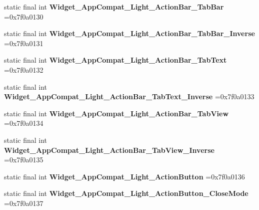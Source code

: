 \begin{DoxyCompactItemize}
\mbox{\label{classproject4_1_1xaria_1_1R_1_1style_a75f0b30f347bdeb58b26cc3a9783d413}} 
static final int {\bfseries Widget\+\_\+\+App\+Compat\+\_\+\+Light\+\_\+\+Action\+Bar\+\_\+\+Tab\+Bar} =0x7f0a0130
\item 
\mbox{\label{classproject4_1_1xaria_1_1R_1_1style_a1adcb303b357611724eb052666e404a6}} 
static final int {\bfseries Widget\+\_\+\+App\+Compat\+\_\+\+Light\+\_\+\+Action\+Bar\+\_\+\+Tab\+Bar\+\_\+\+Inverse} =0x7f0a0131
\item 
\mbox{\label{classproject4_1_1xaria_1_1R_1_1style_a30e60078851ed6f65f0cc13171021b13}} 
static final int {\bfseries Widget\+\_\+\+App\+Compat\+\_\+\+Light\+\_\+\+Action\+Bar\+\_\+\+Tab\+Text} =0x7f0a0132
\item 
\mbox{\label{classproject4_1_1xaria_1_1R_1_1style_ad355df986001f8c977b7c23190f5b34e}} 
static final int {\bfseries Widget\+\_\+\+App\+Compat\+\_\+\+Light\+\_\+\+Action\+Bar\+\_\+\+Tab\+Text\+\_\+\+Inverse} =0x7f0a0133
\item 
\mbox{\label{classproject4_1_1xaria_1_1R_1_1style_a217e7694f25da3cb2c222cfd4df575c8}} 
static final int {\bfseries Widget\+\_\+\+App\+Compat\+\_\+\+Light\+\_\+\+Action\+Bar\+\_\+\+Tab\+View} =0x7f0a0134
\item 
\mbox{\label{classproject4_1_1xaria_1_1R_1_1style_af486c96a599604e1de3ce0b121bfe036}} 
static final int {\bfseries Widget\+\_\+\+App\+Compat\+\_\+\+Light\+\_\+\+Action\+Bar\+\_\+\+Tab\+View\+\_\+\+Inverse} =0x7f0a0135
\item 
\mbox{\label{classproject4_1_1xaria_1_1R_1_1style_aec2c3e72b23d5af8ae78070fea0d3988}} 
static final int {\bfseries Widget\+\_\+\+App\+Compat\+\_\+\+Light\+\_\+\+Action\+Button} =0x7f0a0136
\item 
\mbox{\label{classproject4_1_1xaria_1_1R_1_1style_a0b61f358ff1a7ee96b0a410f57062b6e}} 
static final int {\bfseries Widget\+\_\+\+App\+Compat\+\_\+\+Light\+\_\+\+Action\+Button\+\_\+\+Close\+Mode} =0x7f0a0137

\end{DoxyCompactItemize}
